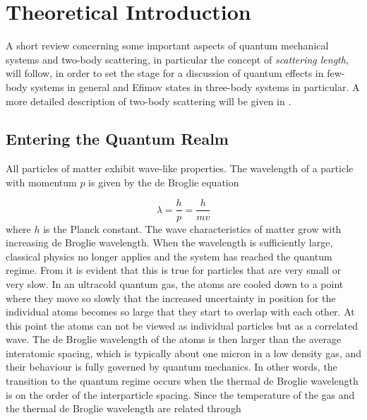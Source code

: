 \section{Theoretical Introduction}
A short review concerning some important aspects of quantum mechanical systems and two-body scattering, in particular the concept of \emph{scattering length}, will follow, in order to set the stage for a discussion of quantum effects in few-body systems in general and Efimov states in three-body systems in particular. A more detailed description of two-body scattering will be given in .

\subsection{Entering the Quantum Realm}
All particles of matter exhibit wave-like properties. The wavelength of a particle with momentum $p$ is given by the de Broglie equation

\begin{equation} \label{eq:1}
\lambda = \frac{h}{p} = \frac{h}{mv}
\end{equation}
where $h$ is the Planck constant. The wave characteristics of matter grow with increasing de Broglie wavelength. When the wavelength is sufficiently large, classical physics no longer applies and the system has reached the quantum regime. From  it is evident that this is true for particles that are very small or very slow. In an ultracold quantum gas, the atoms are cooled down to a point where they move so slowly that the increased uncertainty in position for the individual atoms becomes so large that they start to overlap with each other. At this point the atoms can not be viewed as individual particles but as a correlated wave. The de Broglie wavelength of the atoms is then larger than the average interatomic spacing, which is typically about one micron in a low density gas, and their behaviour is fully governed by quantum mechanics. In other words, the transition to the quantum regime occurs when the thermal de Broglie wavelength is on the order of the interparticle spacing. Since the temperature of the gas and the thermal de Broglie wavelength are related through

